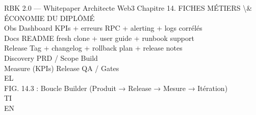 RBK 2.0 — Whitepaper Architecte Web3                                                 Chapitre 14. FICHES MÉTIERS \textbackslash{}& ÉCONOMIE DU DIPLÔMÉ\\
\vspace{0.5em}
\vspace{0.5em}
\vspace{0.5em}
Obs     Dashboard KPIs + erreurs RPC + alerting + logs corrélés\\
Docs    README fresh clone + user guide + runbook support\\
Release Tag + changelog + rollback plan + release notes\\
\vspace{0.5em}
\vspace{0.5em}
\vspace{0.5em}
Discovery          PRD / Scope           Build\\
\vspace{0.5em}
\vspace{0.5em}
\vspace{0.5em}
\vspace{0.5em}
Measure (KPIs)           Release          QA / Gates\\
\vspace{0.5em}
\vspace{0.5em}
\vspace{0.5em}
\vspace{0.5em}
EL\\
FIG. 14.3 : Boucle Builder (Produit → Release → Mesure → Itération)\\
\vspace{0.5em}
\vspace{0.5em}
\vspace{0.5em}
\vspace{0.5em}
TI\\
EN\\
